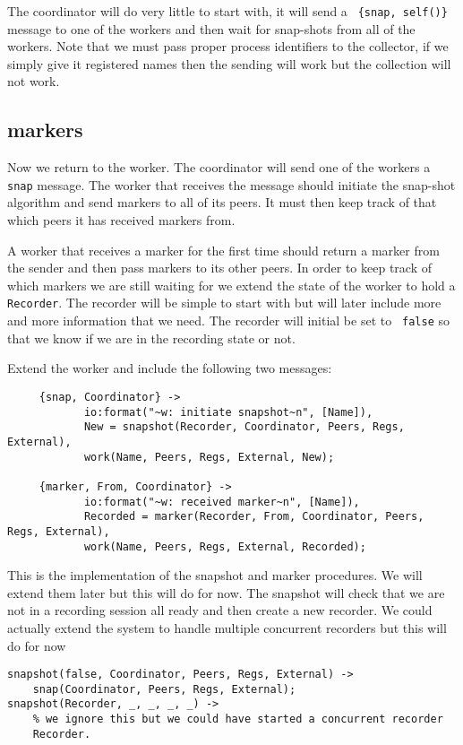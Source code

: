 \documentclass[a4paper,11pt]{article}
\begin{document}
The coordinator will do very little to start with, it will send a {\tt
\{snap, self()\}} message to one of the workers and then wait for
snap-shots from all of the workers. Note that we must pass proper
process identifiers to the collector, if we simply give it registered
names then the sending will work but the collection will not work.

\subsection{markers}

Now we return to the worker. The coordinator will send one of the
workers a {\tt snap} message. The worker that receives the message
should initiate the snap-shot algorithm and send markers to all of its
peers. It must then keep track of that which peers it has received
markers from.

A worker that receives a marker for the first time should return a
marker from the sender and then pass markers to its other peers. In
order to keep track of which markers we are still waiting for we
extend the state of the worker to hold a {\tt Recorder}. The recorder
will be simple to start with but will later include more and more
information that we need. The recorder will initial be set to {\tt
false} so that we know if we are in the recording state or not.

Extend the worker and include the following
two messages:

\begin{verbatim}
     {snap, Coordinator} ->
            io:format("~w: initiate snapshot~n", [Name]),
            New = snapshot(Recorder, Coordinator, Peers, Regs, External),
            work(Name, Peers, Regs, External, New);                    

     {marker, From, Coordinator} ->
            io:format("~w: received marker~n", [Name]),
            Recorded = marker(Recorder, From, Coordinator, Peers, Regs, External),
            work(Name, Peers, Regs, External, Recorded);
\end{verbatim}

This is the implementation of the snapshot and marker procedures. We
will extend them later but this will do for now. The snapshot will
check that we are not in a recording session all ready and then create
a new recorder. We could actually extend the system to handle multiple
concurrent recorders but this will do for now

\begin{verbatim}
snapshot(false, Coordinator, Peers, Regs, External) ->
    snap(Coordinator, Peers, Regs, External);
snapshot(Recorder, _, _, _, _) ->
    % we ignore this but we could have started a concurrent recorder
    Recorder.
\end{verbatim}
\end{document}
